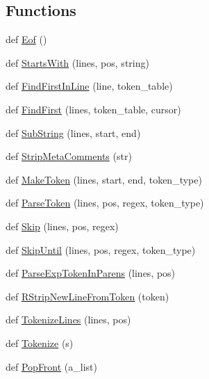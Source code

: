 \subsection*{Functions}
\begin{DoxyCompactItemize}
\item 
def \mbox{\hyperlink{namespacepump_a38844b22bd5a51c098b07c2c36c5c5b3}{Eof}} ()
\item 
def \mbox{\hyperlink{namespacepump_a9353db466a97e632058887a77c3b26aa}{Starts\+With}} (lines, pos, string)
\item 
def \mbox{\hyperlink{namespacepump_af9f92ec64fe45399c7e051115a107ee7}{Find\+First\+In\+Line}} (line, token\+\_\+table)
\item 
def \mbox{\hyperlink{namespacepump_a08f2d05c192d11a134c008287bafef07}{Find\+First}} (lines, token\+\_\+table, cursor)
\item 
def \mbox{\hyperlink{namespacepump_a859edb180cfc24c24fabcfb4f2bedf9e}{Sub\+String}} (lines, start, end)
\item 
def \mbox{\hyperlink{namespacepump_a8c50cb40d65f26771c6f51eb265bb569}{Strip\+Meta\+Comments}} (str)
\item 
def \mbox{\hyperlink{namespacepump_af96d60dc97b160f3a18e63857aabeef7}{Make\+Token}} (lines, start, end, token\+\_\+type)
\item 
def \mbox{\hyperlink{namespacepump_a23761d99dd43d642e94d845218573035}{Parse\+Token}} (lines, pos, regex, token\+\_\+type)
\item 
def \mbox{\hyperlink{namespacepump_a869bd8932d9ee97f3a0e789abd05d590}{Skip}} (lines, pos, regex)
\item 
def \mbox{\hyperlink{namespacepump_a8935d04d89047866b07c59845e2d7d29}{Skip\+Until}} (lines, pos, regex, token\+\_\+type)
\item 
def \mbox{\hyperlink{namespacepump_ae094486db14ecec9347129c5f230042d}{Parse\+Exp\+Token\+In\+Parens}} (lines, pos)
\item 
def \mbox{\hyperlink{namespacepump_ae07150d94399cbe1661abe5929f921e0}{R\+Strip\+New\+Line\+From\+Token}} (token)
\item 
def \mbox{\hyperlink{namespacepump_aa383d59e8e2a9507a576fd4c6b68b6b7}{Tokenize\+Lines}} (lines, pos)
\item 
def \mbox{\hyperlink{namespacepump_aa42c23b1c914c0f86a94f2fa32999905}{Tokenize}} (s)
\item 
def \mbox{\hyperlink{namespacepump_a8e2ff118da88397e88ccf68ebcd2df79}{Pop\+Front}} (a\+\_\+list)
\item 

\end{DoxyCompactItemize}
